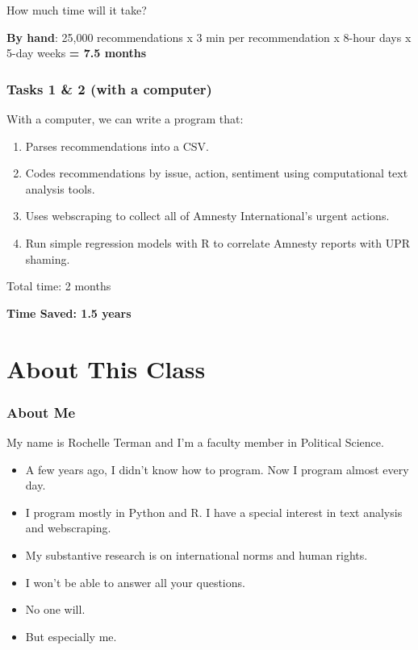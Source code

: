\documentclass[]{book}
\providecommand{\tightlist}{%
  \setlength{\itemsep}{0pt}\setlength{\parskip}{0pt}}
\begin{document}
How much time will it take?

\textbf{By hand}: 25,000 recommendations x 3 min per recommendation x
8-hour days x 5-day weeks \textbf{= 7.5 months}

\subsubsection*{Tasks 1 \& 2 (with a
computer)}\label{tasks-1-2-with-a-computer}

With a computer, we can write a program that:

\begin{enumerate}
\def\labelenumi{\arabic{enumi}.}
\tightlist
\item
  Parses recommendations into a CSV.
\item
  Codes recommendations by issue, action, sentiment using computational
  text analysis tools.
\item
  Uses webscraping to collect all of Amnesty International's urgent
  actions.
\item
  Run simple regression models with R to correlate Amnesty reports with
  UPR shaming.
\end{enumerate}

Total time: 2 months

\textbf{Time Saved: 1.5 years}

\section{About This Class}\label{about-this-class}

\subsubsection*{About Me}\label{about-me}

My name is Rochelle Terman and I'm a faculty member in Political
Science.

\begin{itemize}
\tightlist
\item
  A few years ago, I didn't know how to program. Now I program almost
  every day.
\item
  I program mostly in Python and R. I have a special interest in text
  analysis and webscraping.
\item
  My substantive research is on international norms and human rights.
\item
  I won't be able to answer all your questions.
\item
  No one will.
\item
  But especially me.
\end{itemize}
\end{document}
